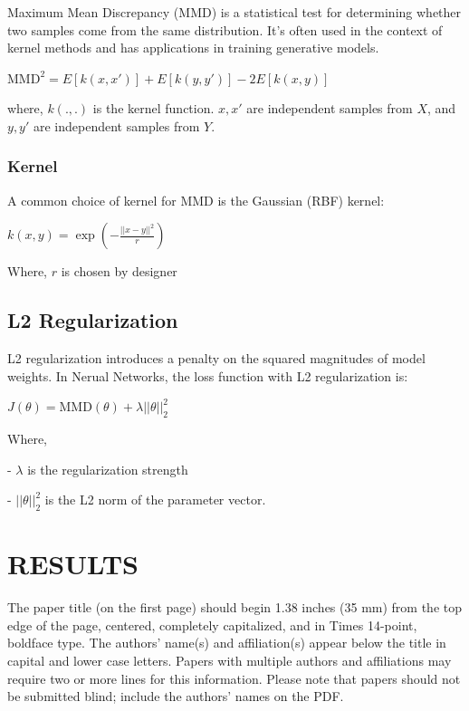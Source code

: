 \documentclass{article}
\begin{document}
Maximum Mean Discrepancy (MMD) is a statistical test for determining whether two samples come from the same distribution. It's often used in the context of kernel methods and has applications in training generative models.

$ \text{MMD}^2 = E[k(x, x')] + E[k(y, y')] - 2E[k(x, y)] $

where, $k(.,.)$ is the kernel function. 
$x, x'$ are independent samples from $X$,
and $y, y'$ are independent samples from $Y$.

\subsubsection{Kernel}
\label{sssec:kernel}

A common choice of kernel for MMD is the Gaussian (RBF) kernel:

$ k(x, y) = \exp\left(-\frac{||x - y||^2}{r}\right) $

Where, $r$ is chosen by designer



\subsection{L2 Regularization}
\label{ssec:l2regularization}

L2 regularization introduces a penalty on the squared magnitudes of model weights. 
In Nerual Networks, the loss function with L2 regularization is:

$ J(\theta) = \text{MMD}(\theta) + \lambda ||\theta||_2^2 $

Where,

- $\lambda$ is the regularization strength

- $||\theta||_2^2$ is the L2 norm of the parameter vector.

\section{RESULTS}
\label{sec:results}

The paper title (on the first page) should begin 1.38 inches (35 mm) from the
top edge of the page, centered, completely capitalized, and in Times 14-point,
boldface type.  The authors' name(s) and affiliation(s) appear below the title
in capital and lower case letters.  Papers with multiple authors and
affiliations may require two or more lines for this information. Please note
that papers should not be submitted blind; include the authors' names on the
PDF.
\end{document}
